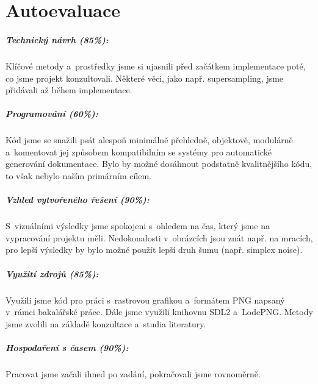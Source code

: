 \documentclass[12pt,a4paper,titlepage,final]{report}
\begin{document}

\chapter{Autoevaluace}

\paragraph{Technický návrh (85\%):}
Klíčové metody a~prostředky jsme si ujasnili před začátkem implementace
poté, co jsme projekt konzultovali. Některé věci, jako např.
supersampling, jsme přidávali až během implementace.

\paragraph{Programování (60\%):}
Kód jsme se snažili psát alespoň minimálně přehledně, objektově,
modulárně a~komentovat jej způsobem kompatibilním se systémy
pro automatické generování dokumentace. Bylo by možné
dosáhnout podstatně kvalitnějšího kódu, to však nebylo naším primárním
cílem.

\paragraph{Vzhled vytvořeného řešení (90\%):}
S~vizuálními výsledky jsme spokojeni s~ohledem na čas, který jsme na
vypracování projektu měli. Nedokonalosti v~obrázcích jsou znát např.
na mracích, pro lepší výsledky by bylo možné použít lepší druh šumu
(např. simplex noise).

\paragraph{Využití zdrojů (85\%):}
Využili jsme kód pro práci s~rastrovou grafikou a~formátem PNG napsaný v~rámci
bakalářské práce. Dále jsme využili knihovnu SDL2 a~LodePNG. Metody jsme zvolili na
základě konzultace a~studia literatury.

\paragraph{Hospodaření s časem (90\%):}
Pracovat jsme začali ihned po zadání, pokračovali jsme rovnoměrně.
\end{document}
